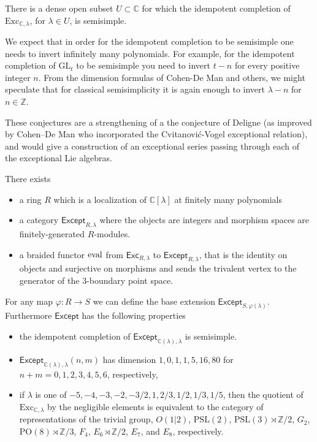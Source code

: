 \documentclass[12pt]{amsart}
\begin{document}
\begin{conjecture}
There is a dense open subset $U \subset \mathbb{C}$ for which the idempotent completion of $\mathrm{Exc}_{\mathbb{C},\lambda}$, for $\lambda \in U$, is semisimple.
\end{conjecture}

We expect that in order for the idempotent completion to be semisimple one needs to invert infinitely many polynomials.  For example, for the idempotent completion of $\mathrm{GL}_t$ to be semisimple you need to invert $t-n$ for every positive integer $n$.  From the dimension formulas of Cohen-De Man and others, we might speculate that for classical semisimplicity it is again enough to invert $\lambda-n$ for $n \in \mathbb{Z}$.

These conjectures are a strengthening of a the conjecture of Deligne (as improved by Cohen--De Man who incorporated the Cvitanović-Vogel exceptional relation), and would give a construction of an exceptional series passing through each of the exceptional Lie algebras.

\begin{conjecture}
There exists
  \begin{itemize}
  \item a ring $R$ which is a localization of $\mathbb{C}[\lambda]$ at finitely many polynomials
  \item a category $\mathsf{Except}_{R,\lambda}$ where the objects are integers and morphism spaces are finitely-generated $R$-modules.
  \item a braided functor $\operatorname{eval}$ from $\mathsf{Exc}_{R,\lambda}$ to $\mathsf{Except}_{R,\lambda}$, that is the identity on objects and surjective on morphisms and sends the trivalent vertex to the generator of the $3$-boundary point space. 
  \end{itemize}
For any map $\varphi: R \rightarrow S$ we can define the base extension $\mathsf{Except}_{S,\varphi(\lambda)}$.  Furthermore $\mathsf{Except}$ has the following properties
\begin{itemize}
\item the idempotent completion of $\mathsf{Except}_{\mathbb{C}(\lambda),\lambda}$ is semisimple.
\item $\mathsf{Except}_{\mathbb{C}(\lambda),\lambda}(n,m)$ has dimension $1,\allowbreak0,\allowbreak1,\allowbreak1,\allowbreak5,\allowbreak16,\allowbreak80$
for $n+m=0,1,2,3,4,5,6$, respectively, 
\item if $\lambda$ is one of $-5, -4, -3, -2, -3/2,1,2/3,1/2, 1/3, 1/5$, then the quotient of $\mathrm{Exc}_{\mathbb{C},\lambda}$ by the negligible elements is equivalent to the category of representations of the trivial group, $O(1 | 2)$, $\mathrm{PSL}(2)$, $\mathrm{PSL}(3) \rtimes \mathbb{Z}/2$, $G_2$, $\mathrm{PO}(8) \rtimes \mathbb{Z}/3$, $F_4$, $E_6 \rtimes \mathbb{Z}/2$, $E_7$, and $E_8$, respectively.
\end{itemize}
\end{conjecture}
\end{document}
